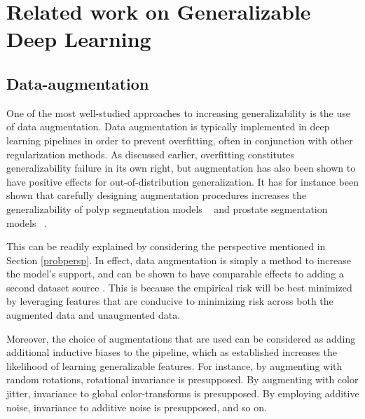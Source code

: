 \section{Related work on Generalizable Deep Learning}





\subsection{Data-augmentation}
One of the most well-studied approaches to increasing generalizability is the use of data augmentation. Data augmentation is typically
implemented in deep learning pipelines in order to prevent overfitting, often in conjunction with other regularization methods. As discussed earlier, overfitting constitutes generalizability failure in its own right, but augmentation has also been shown to have positive effects for out-of-distribution generalization. It has for instance been shown that carefully designing augmentation procedures increases the generalizability of polyp segmentation models ~\cite{polyp_augmentation} and prostate segmentation models ~\cite{augmentation_prostate}. 

This can be readily explained by considering the perspective mentioned in Section \ref{probpersp}. In effect, data augmentation is simply a method to increase the model's support, and can be shown to have comparable effects to adding a second dataset source \cite{generalization_datamod}.  This is because the empirical risk will be best minimized by leveraging features that are conducive to minimizing risk across both the augmented data and unaugmented data. 

Moreover, the choice of augmentations that are used can be considered as adding additional inductive biases to the pipeline, which as established increases the likelihood of learning generalizable features. For instance, by augmenting with random rotations, rotational invariance is presupposed. By augmenting with color jitter, invariance to global color-transforms is presupposed.  By employing additive noise, invariance to additive noise is presupposed, and so on. 

